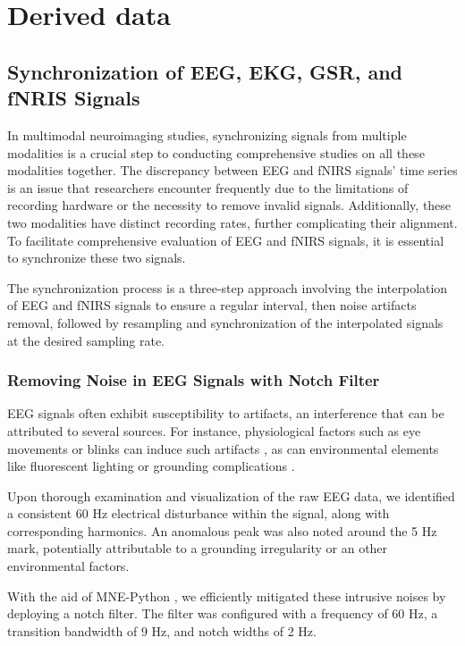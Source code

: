 \section{Derived data}

\subsection{Synchronization of EEG, EKG, GSR, and fNRIS Signals}

In multimodal neuroimaging studies, synchronizing signals from multiple modalities is a crucial step to conducting comprehensive studies on all these modalities together. The discrepancy between EEG and fNIRS signals' time series is an issue that researchers encounter frequently due to the limitations of recording hardware or the necessity to remove invalid signals. Additionally, these two modalities have distinct recording rates, further complicating their alignment. To facilitate comprehensive evaluation of EEG and fNIRS signals, it is essential to synchronize these two signals.

The synchronization process is a three-step approach involving the interpolation of EEG and fNIRS signals to ensure a regular interval, then noise artifacts removal, followed by resampling and synchronization of the interpolated signals at the desired sampling rate.

\subsubsection{Removing Noise in EEG Signals with Notch Filter}

EEG signals often exhibit susceptibility to artifacts, an interference that can be attributed to several sources. For instance, physiological factors such as eye movements or blinks can induce such artifacts \cite{10.3389/fnhum.2012.00278}, as can environmental elements like fluorescent lighting or grounding complications \cite{Kaya21}.

Upon thorough examination and visualization of the raw EEG data, we identified a consistent 60 Hz electrical disturbance within the signal, along with corresponding harmonics. An anomalous peak was also noted around the 5 Hz mark, potentially attributable to a grounding irregularity or an other environmental factors.

With the aid of MNE-Python \cite{GramfortEtAl2013a}, we efficiently mitigated these intrusive noises by deploying a notch filter. The filter was configured with a frequency of 60 Hz, a transition bandwidth of 9 Hz, and notch widths of 2 Hz.

